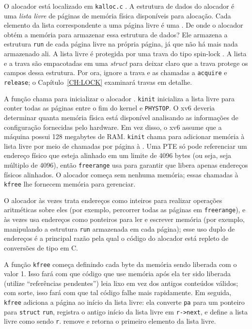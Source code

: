 O alocador está localizado em {\tt kalloc.c} .
A estrutura de dados do alocador é uma
\textit{lista livre}
de páginas de memória física disponíveis
para alocação.
Cada elemento da lista correspondente a uma página livre é uma
.
De onde o alocador obtém a memória
para armazenar essa estrutura de dados?
Ele armazena a estrutura
\lstinline{run}
de cada página livre na própria página,
já que não há mais nada armazenado ali.
A lista livre é
protegida por uma trava do tipo spin-lock
.
A lista e a trava são empacotadas em uma \textit{struct}
para deixar claro que a trava protege os campos
dessa estrutura.
Por ora, ignore a trava e as chamadas a
\lstinline{acquire}
e
\lstinline{release};
o Capítulo~\ref{CH:LOCK} examinará
travas em detalhe.

A função
chama
para inicializar o alocador
.
\lstinline{kinit}
inicializa a lista livre para conter
todas as páginas entre o fim do kernel e {\tt PHYSTOP}.
O xv6 deveria determinar quanta memória física
está disponível analisando as informações de configuração
fornecidas pelo hardware.
Em vez disso, o xv6 assume que a máquina possui
128 megabytes de RAM.
\lstinline{kinit}
chama
para adicionar memória à lista livre por meio de chamadas por página à
.
Uma PTE só pode referenciar um endereço físico que esteja alinhado
em um limite de 4096 bytes (ou seja, seja múltiplo de 4096), então
\lstinline{freerange}
usa
para garantir que libera apenas endereços físicos alinhados.
O alocador começa sem nenhuma memória;
essas chamadas à
\lstinline{kfree}
lhe fornecem memória para gerenciar.

O alocador às vezes trata endereços como inteiros
para realizar operações aritméticas sobre eles (por exemplo,
percorrer todas as páginas em
\lstinline{freerange}),
e às vezes usa endereços como ponteiros para ler e
escrever memória (por exemplo, manipulando a
estrutura
\lstinline{run}
armazenada em cada página);
esse uso duplo de endereços é a principal razão pela qual o
código do alocador está repleto de conversões de tipo em C.

A função
\lstinline{kfree}
começa definindo cada byte da
memória sendo liberada com o valor 1.
Isso fará com que código que use memória após ela ter sido liberada
(utilize “referências pendentes”)
leia lixo em vez dos antigos conteúdos válidos;
com sorte, isso fará com que tal código falhe mais rapidamente.
Em seguida,
\lstinline{kfree}
adiciona a página ao início da lista livre:
ela converte
\lstinline{pa}
para um ponteiro para
\lstinline{struct}
\lstinline{run},
registra o antigo início da lista livre em
\lstinline{r->next},
e define a lista livre como sendo
\lstinline{r}.
remove e retorna o primeiro elemento da lista livre.

